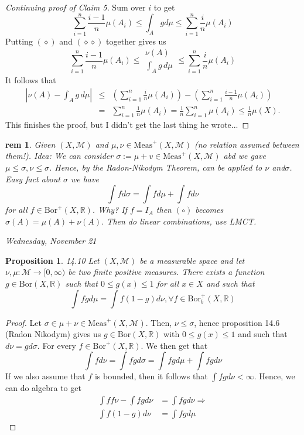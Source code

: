 \documentclass[letterpaper, 12pt]{article}
\newcommand{\fin}{\qquad \quad \hfill \framebox[1.75mm][l]{\,}}
\newcommand{\cM}{\mathcal{M}}
\newcommand{\bR}{\mathbb{R}}
\newcommand{\Meas}{\mathrm{Meas}}
\newcommand{\Bor}{\mathrm{Bor}}
\providecommand{\abs}[1]{\left\lvert#1\right\rvert}
\theoremstyle{stdthm}
\newtheorem{prop}[thm]{Proposition}
\theoremstyle{stddef}
\newtheorem{rem}[thm]{rem} %
\theoremstyle{stdnonum}
\theoremstyle{stdqands}
\theoremstyle{stdbold}
\begin{document}
\begin{proof}[Continuing proof of Claim 5]
Sum over $i$ to get 
\[ \tag{$\diamond \diamond $} \sum_{i=1}^n \frac{i-1}{n} \mu(A_i) \leq \int_A g d\mu \leq \sum_{i=1}^n \frac{i}{n}\mu(A_i)\]
Putting $(\diamond)$ and $(\diamond \diamond)$ together gives us
\[
\sum_{i=1}^n \frac{i-1}{n} \mu(A_i) \leq \begin{array}{c}
\nu(A)\\
\int_A g \, d\mu
\end{array} \leq \sum_{i=1}^n \frac{i}{n} \mu(A_i)
\]
It follows that 
\begin{eqnarray*}
\abs{\nu(A) - \int_A g\, d\mu} &\leq& \left(\sum_{i=1}^n \frac{i}{n} \mu (A_i)\right) - \left(\sum_{i=1}^n \frac{i-1}{n} \mu (A_i)\right)\\
&=& \sum_{i=1}^n \frac{1}{n}\mu(A_i) = \frac{1}{n}\sum_{i=1}^n \mu(A_i) \leq \frac{1}{n}\mu(X).
\end{eqnarray*}
This finishes the proof, but I didn't get the last thing he wrote...
\end{proof}

\begin{rem}
Given $(X,\cM)$ and $\mu,\nu \in \Meas^+(X,\cM)$ (no relation assumed between them!). Idea: We can consider $\sigma:= \mu + v \in \Meas^+(X,\cM)$ abd we gave $\mu \leq \sigma, \nu \leq \sigma$. Hence, by the Radon-Nikodym Theorem, can be applied to $\nu$ and$\sigma$. Easy fact about $\sigma$ we have 
\[\tag{$\circ$} \int f d\sigma = \int f d\mu + \int f d\nu   \]
for all $f \in \Bor^+(X,\bR)$. Why? If $f = I_A$ then $(\circ)$ becomes $\sigma(A) = \mu(A) + \nu(A)$. Then do linear combinations, use LMCT. 
\end{rem}

\begin{center}
\emph{Wednesday, November 21}
\end{center}

\begin{prop}
14.10 Let $(X,\cM)$ be a measurable space and let $\nu, \mu: \cM \to [0, \infty)$ be two finite positive measures. There exists a function $g \in \Bor(X,\bR)$ such that $0\leq g(x) \leq 1$ for all $x \in X$ and such that 
\[ \int fg d\mu = \int f(1-g) d\nu, \forall f \in \Bor_b^+(X,\bR)\]
\end{prop}
\begin{proof}
Let $\sigma \in \mu + \nu \in \Meas^+(X,\cM)$. Then, $\nu \leq \sigma$, hence proposition 14.6 (Radon Nikodym) gives us $g \in \Bor(X,\bR)$ with $0 \leq g(x) \leq 1$ and such that $d\nu = g d\sigma$. For every $f \in \Bor^+(X,\bR)$. We then get that 
\[ \int f d \nu = \int fg d \sigma = \int fg d\mu + \int fg d\nu \]
If we also assume that $f$ is bounded, then it follows that $\int fg d\nu < \infty$. Hence, we can do algebra to get 
\begin{align*}
\int f f\nu - \int fg d\nu &= \int fg d\nu \Rightarrow \\
\int f(1-g) d\nu &= \int fg d\mu
\end{align*}

\end{proof}
\end{document}
